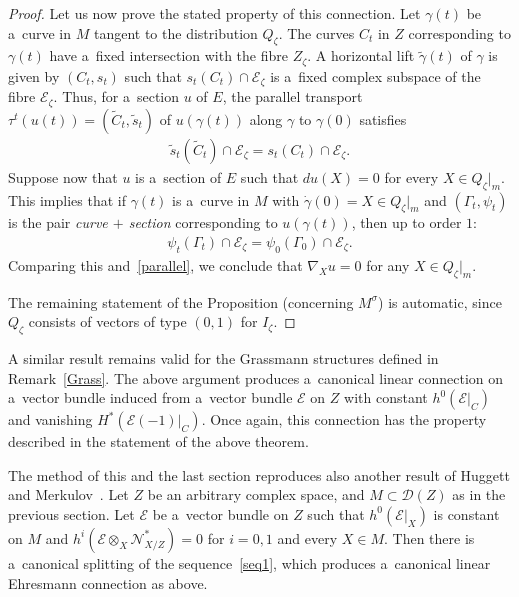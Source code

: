 \documentclass[pdftex]{sigma}
\numberwithin{equation}{section}
\begin{document}
\begin{proof}
Let us now prove the stated property of this connection.
Let $\gamma(t)$ be a~curve in $M$ tangent to the distribution $Q_\zeta$.
The curves $C_t$ in $Z$ corresponding to $\gamma(t)$ have a~f\/ixed intersection with the f\/ibre $Z_\zeta$.
A horizontal lift $\tilde\gamma(t)$ of $\gamma$ is given by $(C_t,s_t)$ such that $s_t(C_t)\cap {\mathcal{E}}_\zeta$ is
a~f\/ixed complex subspace of the f\/ibre ${\mathcal{E}}_\zeta$.
Thus, for a~section $u$ of $E$, the parallel transport $\tau^t(u(t))= (\tilde C_t,\tilde s_t)$ of $u(\gamma(t))$ along
$\gamma$ to $\gamma(0)$ satisf\/ies
\begin{gather}
\tilde s_t(\tilde C_t)\cap {\mathcal{E}}_\zeta= s_t(C_t)\cap {\mathcal{E}}_\zeta.
\label{parallel}
\end{gather}
Suppose now that $u$ is a~section of $E$ such that $du(X)=0$ for every $X\in Q_\zeta|_m$.
This implies that if $\gamma(t)$ is a~curve in $M$ with $\dot\gamma(0)=X\in Q_\zeta|_m$ and $(\Gamma_t,\psi_t)$ is the
pair {\em curve $+$ section} corresponding to $u(\gamma(t))$, then up to order $1$:{\samepage
\begin{gather*}
\psi_t(\Gamma_t)\cap {\mathcal{E}}_\zeta=\psi_0(\Gamma_0)\cap{\mathcal{E}}_\zeta.
\end{gather*}
Comparing this and~\eqref{parallel}, we conclude that $\nabla_X u=0$ for any $X\in Q_\zeta|_m$.}

The remaining statement of the Proposition (concerning $M^\sigma$) is automatic, since $Q_\zeta$ consists of vectors of
type $(0,1)$ for $I_\zeta$.
\end{proof}

\begin{Remark}
A similar result remains valid for the Grassmann structures def\/ined in Remark~\ref{Grass}.
The above argument produces a~canonical linear connection on a~vector bundle induced from a~vector bundle
${\mathcal{E}}$ on $Z$ with constant $h^0({\mathcal{E}}|_C)$ and vanishing $H^\ast({\mathcal{E}}(-1)|_C)$.
Once again, this connection has the property described in the statement of the above theorem.
\end{Remark}

\begin{Remark}
The method of this and the last section reproduces also another result of Huggett and Merkulov~\cite{HM}.
Let $Z$ be an arbitrary complex space, and $M\subset {\mathcal{D}}(Z)$ as in the previous section.
Let ${\mathcal{E}}$ be a~vector bundle on $Z$ such that $h^0({\mathcal{E}}|_X)$ is constant on $M$ and
\mbox{$h^i({\mathcal{E}}\otimes_X {\mathcal{N}}_{X/Z}^\ast)=0$} for $i=0,1$ and every $X\in M$.
Then there is a~canonical splitting of the sequence~\eqref{seq1}, which produces a~canonical linear Ehresmann connection
as above.
\end{Remark}
\end{document}
